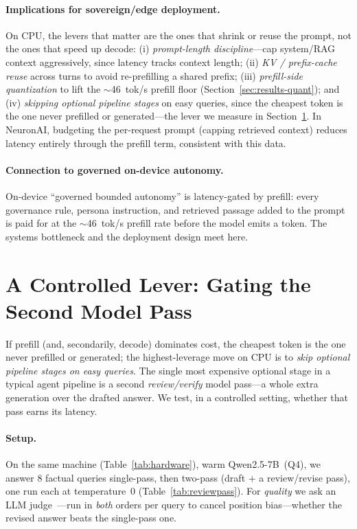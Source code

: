 \documentclass[10pt,twocolumn]{article}
\begin{document}
\paragraph{Implications for sovereign/edge deployment.}
On CPU, the levers that matter are the ones that shrink or reuse the
prompt, not the ones that speed up decode: (i) \emph{prompt-length
discipline}---cap system/RAG context aggressively, since latency tracks
context length; (ii) \emph{KV / prefix-cache reuse} across turns to avoid
re-prefilling a shared prefix; (iii) \emph{prefill-side quantization} to
lift the $\sim$46~tok/s prefill floor (Section~\ref{sec:results-quant}); and
(iv) \emph{skipping optional pipeline stages} on easy queries, since the
cheapest token is the one never prefilled or generated---the lever we
measure in Section~\ref{sec:lever}. In NeuronAI, budgeting the per-request
prompt (capping retrieved context) reduces latency entirely through the
prefill term, consistent with this data.

\paragraph{Connection to governed on-device autonomy.}
On-device ``governed bounded autonomy'' is latency-gated by prefill: every
governance rule, persona instruction, and retrieved passage added to the
prompt is paid for at the $\sim$46~tok/s prefill rate before the model
emits a token. The systems bottleneck and the deployment design meet here.

\section{A Controlled Lever: Gating the Second Model Pass}
\label{sec:lever}
If prefill (and, secondarily, decode) dominates cost, the cheapest token is
the one never prefilled or generated; the highest-leverage move on CPU is to
\emph{skip optional pipeline stages on easy queries}. The single most
expensive optional stage in a typical agent pipeline is a second
\emph{review/verify} model pass---a whole extra generation over the drafted
answer. We test, in a controlled setting, whether that pass earns its
latency.

\paragraph{Setup.}
On the same machine (Table~\ref{tab:hardware}), warm Qwen2.5-7B~(Q4), we
answer 8 factual queries single-pass, then two-pass (draft $+$ a
review/revise pass), one run each at temperature~0
(Table~\ref{tab:reviewpass}). For \emph{quality} we ask an LLM
judge~\cite{zheng2023judging}---run in \emph{both} orders per query to cancel
position bias---whether the revised answer beats the single-pass one.
\end{document}
